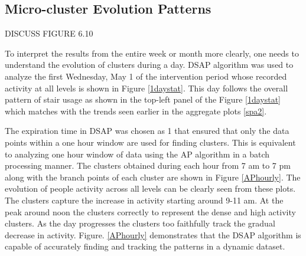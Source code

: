 \subsection{Micro-cluster Evolution Patterns}
DISCUSS FIGURE 6.10
 
To interpret the results from the entire week or month more clearly, one needs to understand the evolution of clusters during a day. DSAP algorithm was used to analyze the first Wednesday, May 1 of the intervention period whose recorded activity at all levels is shown in Figure \ref{1daystat}. This day follows the overall pattern of stair usage as shown in the top-left panel of the Figure \ref{1daystat} which matches with the trends seen earlier in the aggregate plots \ref{spa2}.

The expiration time in DSAP was chosen as 1 that ensured that only the data points within a one hour window are used for finding clusters. This is equivalent to analyzing one hour window of data using the AP algorithm in a batch processing manner. The clusters obtained during each hour from 7 am to 7 pm along with the branch points of each cluster are shown in Figure \ref{APhourly}. The evolution of people activity across all levels can be clearly seen from these plots. The clusters capture the increase in activity starting around 9-11 am. At the peak around noon the clusters correctly to represent the dense and high activity clusters. As the day progresses the clusters too faithfully track the gradual decrease in activity. Figure. \ref{APhourly} demonstrates that the DSAP algorithm is capable of accurately finding and tracking the patterns in a dynamic dataset.

